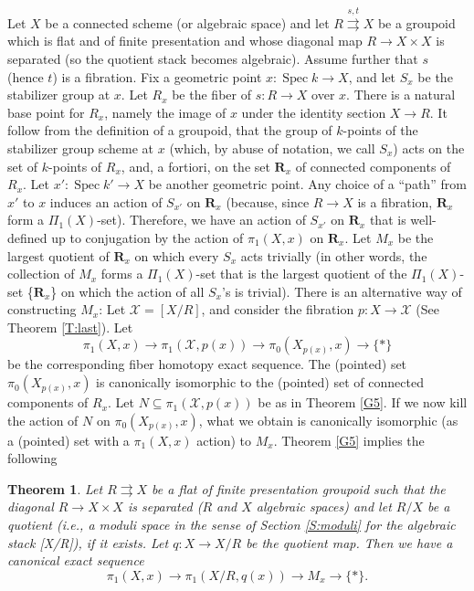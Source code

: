 \documentclass{amsart}
\newtheorem{thm}{Theorem}[section]
\theoremstyle{definition}
\theoremstyle{remark}
\theoremstyle{remark}
\newcommand{\X}{\mathcal{X}}
\newcommand{\x}{\times}
\newcommand{\st}[1]{\stackrel{#1}{\rightrightarrows}}
\let\:=\colon
\newcommand{\Spec}{\operatorname{Spec}}
\begin{document}
Let $X$ be a connected scheme (or algebraic space) and let $R
\st{s,t} X$ be a groupoid which is flat and of finite presentation
and whose diagonal map $R \to X \x X$ is separated (so the
quotient stack becomes algebraic). Assume further that $s$ (hence
$t$) is a fibration. Fix a geometric point $x \: \Spec k \to X$,
and let $S_x$ be the stabilizer group at $x$. Let $R_x$ be the
fiber of $s \: R \to X$ over $x$. There is a natural base point
for $R_x$, namely the image of $x$ under the identity section $X
\to R$. It follow from the definition of a groupoid, that the
group of $k$-points of the stabilizer group scheme at $x$ (which,
by abuse of notation, we call $S_x$) acts on the  set of
$k$-points of $R_x$, and, a fortiori,
 on the  set $\mathbf{R}_x$ of connected components of  $R_x$. Let $x' \: \Spec k' \to X$
be another geometric point. Any choice of a ``path'' from $x'$ to
$x$ induces an action of $S_{x'}$ on $\mathbf{R}_x$ (because,
since $R \to X$ is a fibration, $\mathbf{R}_x$ form a
$\Pi_1(X)$-set). Therefore, we have an action of $S_{x'}$
 on $\mathbf{R}_x$ that is well-defined up to conjugation by
the action  of $\pi_1(X,x)$ on $\mathbf{R}_x$. Let $M_x$ be the
largest quotient of $\mathbf{R}_x$ on which every $S_x$ acts
trivially (in other words, the collection of  $M_x$ forms a
$\Pi_1(X)$-set that is the largest quotient of the  $\Pi_1(X)$-set
\{$\mathbf{R}_x$\} on which the action of all $S_x$'s is trivial).
There is an alternative way of constructing $M_x$: Let $\X=[X/R]$,
and consider the fibration $p \:X \to \X$ (See Theorem
\ref{T:last}). Let $$\pi_1(X,x) \to \pi_1(\X,p(x)) \to
\pi_0(X_{p(x)},x) \to \{*\}$$ be the corresponding fiber homotopy
exact sequence. The (pointed) set  $\pi_0(X_{p(x)},x)$ is
canonically isomorphic to the (pointed) set of connected
components of $R_x$. Let $N \subseteq \pi_1(\X,p(x))$ be as in
Theorem \ref{G5}. If we now kill the action of $N$ on
$\pi_0(X_{p(x)},x)$, what  we obtain is canonically isomorphic (as
a (pointed) set with a $\pi_1(X,x)$ action) to $M_x$. Theorem
\ref{G5} implies the following

\begin{thm}{\label{T:quot1}}
Let $R \st{} X$ be a flat of finite presentation groupoid such
that the diagonal $R \to X \x X$ is separated ($R$ and $X$
algebraic spaces) and let $R/X$ be a quotient (i.e., a moduli
space in the sense of Section \ref{S:moduli} for the algebraic
stack [X/R]), if it exists. Let $q \: X \to X/R$ be the quotient
map. Then we have a canonical exact sequence $$\pi_1(X,x) \to
\pi_1(X/R,q(x)) \to M_x \to \{*\}.$$
\end{thm}
\end{document}

